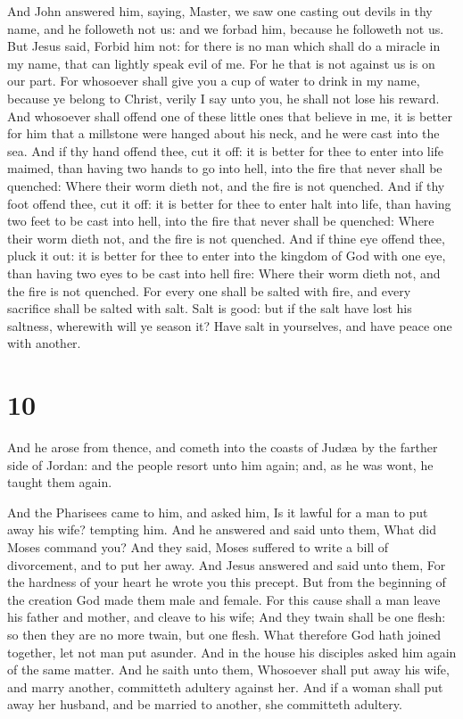  And John answered him, saying, Master, we saw one casting
out devils in thy name, and he followeth not us: and we forbad him,
because he followeth not us.  But Jesus said, Forbid him
not: for there is no man which shall do a miracle in my name, that can
lightly speak evil of me.  For he that is not against us is
on our part.  For whosoever shall give you a cup of water
to drink in my name, because ye belong to Christ, verily I say unto you,
he shall not lose his reward.  And whosoever shall offend
one of these little ones that believe in me, it is better for him that a
millstone were hanged about his neck, and he were cast into the sea.
 And if thy hand offend thee, cut it off: it is better for
thee to enter into life maimed, than having two hands to go into hell,
into the fire that never shall be quenched:  Where their
worm dieth not, and the fire is not quenched.  And if thy
foot offend thee, cut it off: it is better for thee to enter halt into
life, than having two feet to be cast into hell, into the fire that
never shall be quenched:  Where their worm dieth not, and
the fire is not quenched.  And if thine eye offend thee,
pluck it out: it is better for thee to enter into the kingdom of God
with one eye, than having two eyes to be cast into hell fire:
 Where their worm dieth not, and the fire is not quenched.
 For every one shall be salted with fire, and every
sacrifice shall be salted with salt.  Salt is good: but if
the salt have lost his saltness, wherewith will ye season it? Have salt
in yourselves, and have peace one with another.

\hypertarget{section-9}{%
\section{10}\label{section-9}}

 And he arose from thence, and cometh into the coasts of
Judæa by the farther side of Jordan: and the people resort unto him
again; and, as he was wont, he taught them again.

 And the Pharisees came to him, and asked him, Is it lawful
for a man to put away his wife? tempting him.  And he
answered and said unto them, What did Moses command you? 
And they said, Moses suffered to write a bill of divorcement, and to put
her away.  And Jesus answered and said unto them, For the
hardness of your heart he wrote you this precept.  But from
the beginning of the creation God made them male and female.
 For this cause shall a man leave his father and mother, and
cleave to his wife;  And they twain shall be one flesh: so
then they are no more twain, but one flesh.  What therefore
God hath joined together, let not man put asunder.  And in
the house his disciples asked him again of the same matter.
 And he saith unto them, Whosoever shall put away his wife,
and marry another, committeth adultery against her.  And if
a woman shall put away her husband, and be married to another, she
committeth adultery.

